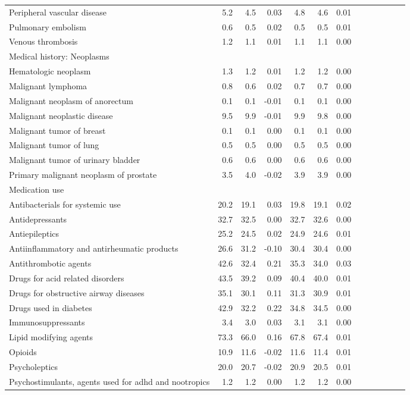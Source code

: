 \documentclass[11pt,]{article}
\begin{document}
\begin{longtable}{lrrrrrrrrrrrr}
      Peripheral vascular disease &  5.2 &  4.5 &  0.03 &  4.8 &  4.6 &  0.01 \\ 
      Pulmonary embolism &  0.6 &  0.5 &  0.02 &  0.5 &  0.5 &  0.01 \\ 
      Venous thrombosis &  1.2 &  1.1 &  0.01 &  1.1 &  1.1 &  0.00 \\ 
  Medical history: Neoplasms &    &    &     &    &    &     \\ 
      Hematologic neoplasm &  1.3 &  1.2 &  0.01 &  1.2 &  1.2 &  0.00 \\ 
      Malignant lymphoma &  0.8 &  0.6 &  0.02 &  0.7 &  0.7 &  0.00 \\ 
      Malignant neoplasm of anorectum &  0.1 &  0.1 & -0.01 &  0.1 &  0.1 &  0.00 \\ 
      Malignant neoplastic disease &  9.5 &  9.9 & -0.01 &  9.9 &  9.8 &  0.00 \\ 
      Malignant tumor of breast &  0.1 &  0.1 &  0.00 &  0.1 &  0.1 &  0.00 \\ 
      Malignant tumor of lung &  0.5 &  0.5 &  0.00 &  0.5 &  0.5 &  0.00 \\ 
      Malignant tumor of urinary bladder &  0.6 &  0.6 &  0.00 &  0.6 &  0.6 &  0.00 \\ 
      Primary malignant neoplasm of prostate &  3.5 &  4.0 & -0.02 &  3.9 &  3.9 &  0.00 \\ 
  Medication use &    &    &     &    &    &     \\ 
      Antibacterials for systemic use & 20.2 & 19.1 &  0.03 & 19.8 & 19.1 &  0.02 \\ 
      Antidepressants & 32.7 & 32.5 &  0.00 & 32.7 & 32.6 &  0.00 \\ 
      Antiepileptics & 25.2 & 24.5 &  0.02 & 24.9 & 24.6 &  0.01 \\ 
      Antiinflammatory and antirheumatic products & 26.6 & 31.2 & -0.10 & 30.4 & 30.4 &  0.00 \\ 
      Antithrombotic agents & 42.6 & 32.4 &  0.21 & 35.3 & 34.0 &  0.03 \\ 
      Drugs for acid related disorders & 43.5 & 39.2 &  0.09 & 40.4 & 40.0 &  0.01 \\ 
      Drugs for obstructive airway diseases & 35.1 & 30.1 &  0.11 & 31.3 & 30.9 &  0.01 \\ 
      Drugs used in diabetes & 42.9 & 32.2 &  0.22 & 34.8 & 34.5 &  0.00 \\ 
      Immunosuppressants &  3.4 &  3.0 &  0.03 &  3.1 &  3.1 &  0.00 \\ 
      Lipid modifying agents & 73.3 & 66.0 &  0.16 & 67.8 & 67.4 &  0.01 \\ 
      Opioids & 10.9 & 11.6 & -0.02 & 11.6 & 11.4 &  0.01 \\ 
      Psycholeptics & 20.0 & 20.7 & -0.02 & 20.9 & 20.5 &  0.01 \\ 
      Psychostimulants, agents used for adhd and nootropics &  1.2 &  1.2 &  0.00 &  1.2 &  1.2 &  0.00 \\ 
   \bottomrule\end{longtable}
\end{document}
